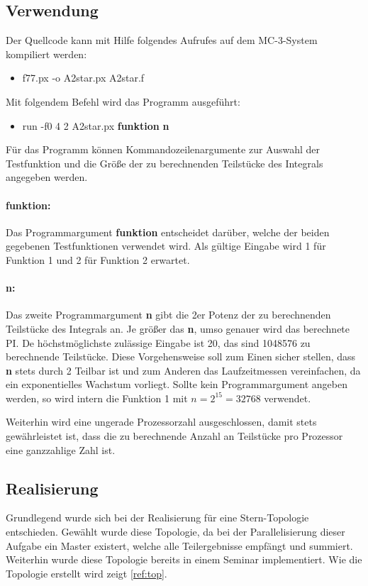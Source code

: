 \subsection{Verwendung}
\label{ref:verwendung}
Der Quellcode kann mit Hilfe folgendes Aufrufes auf dem MC-3-System kompiliert werden:
\begin{itemize}
	\item f77.px -o A2star.px A2star.f
\end{itemize}
Mit folgendem Befehl wird das Programm ausgeführt:
\begin{itemize}
	\item run -f0 4 2 A2star.px \textbf{funktion} \textbf{n}
\end{itemize}

Für das Programm können Kommandozeilenargumente zur Auswahl der Testfunktion und die Größe der zu berechnenden Teilstücke des Integrals angegeben werden.
\paragraph{funktion:}
Das Programmargument \textbf{funktion} entscheidet darüber, welche der beiden gegebenen Testfunktionen verwendet wird.
Als gültige Eingabe wird 1 für Funktion 1 und 2 für Funktion 2 erwartet.
\paragraph{n:}
Das zweite Programmargument \textbf{n} gibt die 2er Potenz der zu berechnenden Teilstücke des Integrals an.
Je größer das \textbf{n}, umso genauer wird das berechnete PI.
De höchstmöglichste zulässige Eingabe ist 20, das sind 1048576 zu berechnende Teilstücke.
Diese Vorgehensweise soll zum Einen sicher stellen, dass \textbf{n} stets durch 2 Teilbar ist und zum Anderen das Laufzeitmessen vereinfachen, da ein exponentielles Wachstum vorliegt.
Sollte kein Programmargument angeben werden, so wird intern die Funktion 1 mit $n = 2^{15} = 32768$ verwendet.

Weiterhin wird eine ungerade Prozessorzahl ausgeschlossen, damit stets gewährleistet ist, dass die zu berechnende Anzahl an Teilstücke pro Prozessor eine ganzzahlige Zahl ist.

\subsection{Realisierung}
\label{ref:realisierung}
Grundlegend wurde sich bei der Realisierung für eine Stern-Topologie entschieden.
Gewählt wurde diese Topologie, da bei der Parallelisierung dieser Aufgabe ein Master existert, welche alle Teilergebnisse empfängt und summiert.
Weiterhin wurde diese Topologie bereits in einem Seminar implementiert.
Wie die Topologie erstellt wird zeigt \autoref{ref:top}.

